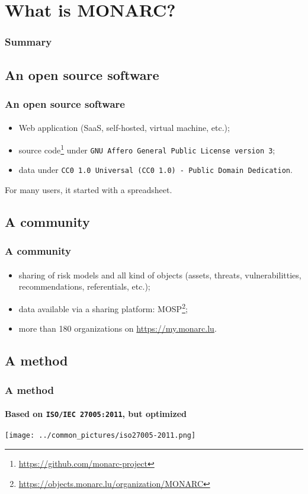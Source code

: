 %
%
\section{What is MONARC?}
\begin{frame}
    \frametitle{Summary}
\end{frame}
\subsection{An open source software}
\begin{frame}
\frametitle{An open source software}
\framesubtitle{}
    \begin{itemize}
        \item Web application (SaaS, self-hosted, virtual machine, etc.);
        \item source code\footnote{\url{https://github.com/monarc-project}} under \texttt{GNU Affero General Public License version 3};
        \item data under \texttt{CC0 1.0 Universal (CC0 1.0) - Public Domain Dedication}.
    \end{itemize}
    \bigskip
    For many users, it started with a spreadsheet.
\end{frame}

\subsection{A community}
\begin{frame}
\frametitle{A community}
\framesubtitle{}
    \begin{itemize}
        \item sharing of risk models and all kind of objects (assets, threats, vulnerabilitties, recommendations, referentials, etc.);
        \item data available via a sharing platform: MOSP\footnote{\url{https://objects.monarc.lu/organization/MONARC}};
        \item more than 180 organizations on \url{https://my.monarc.lu}.
    \end{itemize}
\end{frame}

\subsection{A method}
\begin{frame}
\frametitle{A method}
\framesubtitle{Based on \texttt{ISO/IEC 27005:2011}, but optimized}
    \begin{center}
        \texttt{[image: ../common\_pictures/iso27005-2011.png]}
    \end{center}
\end{frame}
